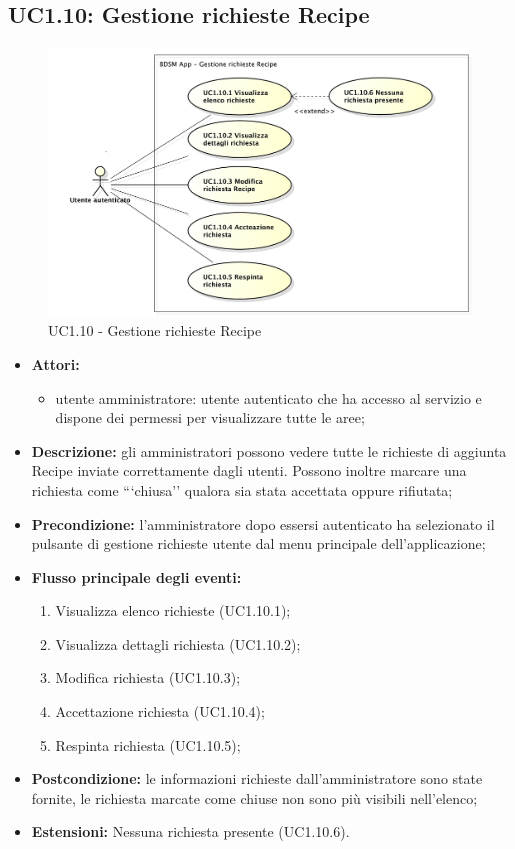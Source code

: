 \subsection{UC1.10: Gestione richieste Recipe}
\begin{figure}[htbp]
	\centering
	\centerline{\includegraphics[scale=0.50]{./images/UC1_10.pdf}}
	\caption{UC1.10 - Gestione richieste Recipe}
\end{figure}

\begin{itemize}
	\item \textbf{Attori:}
	\begin{itemize}
		\item utente amministratore: utente autenticato che ha accesso al servizio e dispone dei permessi per visualizzare tutte le aree;
	\end{itemize}
	\item \textbf{Descrizione:} gli amministratori possono vedere tutte le richieste di aggiunta Recipe inviate correttamente dagli utenti. Possono inoltre marcare una richiesta come ```chiusa'' qualora sia stata accettata oppure rifiutata;
	\item \textbf{Precondizione:} l'amministratore dopo essersi autenticato ha selezionato il pulsante di gestione richieste utente dal menu principale dell'applicazione;
	\item \textbf{Flusso principale degli eventi:}
	\begin{enumerate}
		\item Visualizza elenco richieste (UC1.10.1);
		\item Visualizza dettagli richiesta (UC1.10.2);
		\item Modifica richiesta (UC1.10.3);
		\item Accettazione richiesta (UC1.10.4);
		\item Respinta richiesta (UC1.10.5);
	\end{enumerate}
	\item \textbf{Postcondizione:} le informazioni richieste dall'amministratore sono state fornite, le richiesta marcate come chiuse non sono più visibili nell'elenco;
	\item \textbf{Estensioni:} Nessuna richiesta presente (UC1.10.6).
\end{itemize}

